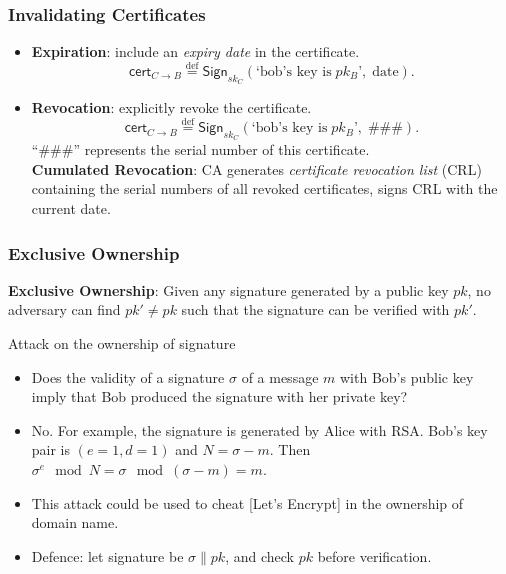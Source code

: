 \begin{frame}\frametitle{Invalidating Certificates}
\begin{itemize}
\item \textbf{Expiration}: include an \emph{expiry date} in the certificate.
\[\mathsf{cert}_{C \to B} \overset{\text{def}}{=} \mathsf{Sign}_{sk_C}(\text{`bob's key is}\; pk_B \text{'},\; \text{date}). \]
\item \textbf{Revocation}: explicitly revoke the certificate.
\[\mathsf{cert}_{C \to B} \overset{\text{def}}{=} \mathsf{Sign}_{sk_C}(\text{`bob's key is}\; pk_B \text{'},\; \text{\#\#\#}).  \]
``\#\#\#'' represents the serial number of this certificate.\\
\textbf{Cumulated Revocation}: CA generates \emph{certificate revocation list} (CRL) containing the serial numbers of all revoked certificates, signs CRL with the current date. 
\end{itemize}
\end{frame}
\begin{frame}\frametitle{Exclusive Ownership}
\textbf{Exclusive Ownership}: Given any signature generated by a public key $pk$, no adversary can find $pk' \neq pk$ such that the signature can be verified with $pk'$.
\begin{exampleblock}{Attack on the ownership of signature}
\begin{itemize}
\item Does the validity of a signature $\sigma$ of a message $m$ with Bob's public key imply that Bob produced the signature with her private key?
\item No. For example, the signature is generated by Alice with RSA. Bob's key pair is $(e=1, d=1)$ and $N = \sigma - m$. Then $\sigma^e \mod N = \sigma \mod (\sigma - m) = m$.
\item This attack could be used to cheat [Let's Encrypt] in the ownership of domain name.
\item Defence: let signature be $\sigma \| pk$, and check $pk$ before verification.
\end{itemize}
\end{exampleblock}
\end{frame}
